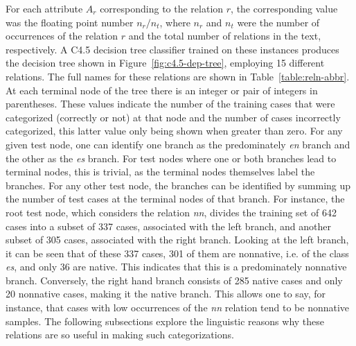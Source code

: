 \documentclass[main.tex]{subfiles}
\begin{document}
      For each attribute $A_r$ corresponding to the relation $r$, the corresponding value was the floating point number $n_r/n_t$, where $n_r$ and $n_t$ were the number of occurrences of the relation $r$ and the total number of relations in the text, respectively. A C4.5 decision tree classifier trained on these instances produces the decision tree shown in Figure~\ref{fig:c4.5-dep-tree}, employing 15 different relations. The full names for these relations are shown in Table~\ref{table:reln-abbr}. At each terminal node of the tree there is an integer or pair of integers in parentheses. These values indicate the number of the training cases that were categorized (correctly or not) at that node and the number of cases incorrectly categorized, this latter value only being shown when greater than zero. For any given test node, one can identify one branch as the predominately \textit{en} branch and the other as the \textit{es} branch. For test nodes where one or both branches lead to terminal nodes, this is trivial, as the terminal nodes themselves label the branches. For any other test node, the branches can be identified by summing up the number of test cases at the terminal nodes of that branch. For instance, the root test node, which considers the relation \textit{nn}, divides the training set of 642 cases into a subset of 337 cases, associated with the left branch, and another subset of 305 cases, associated with the right branch. Looking at the left branch, it can be seen that of these 337 cases, 301 of them are nonnative, i.e. of the class \textit{es}, and only 36 are native. This indicates that this is a predominately nonnative branch. Conversely, the right hand branch consists of 285 native cases and only 20 nonnative cases, making it the native branch. This allows one to say, for instance, that cases with low occurrences of the \textit{nn} relation tend to be nonnative samples. The following subsections explore the linguistic reasons why these relations are so useful in making such categorizations.
\end{document}

